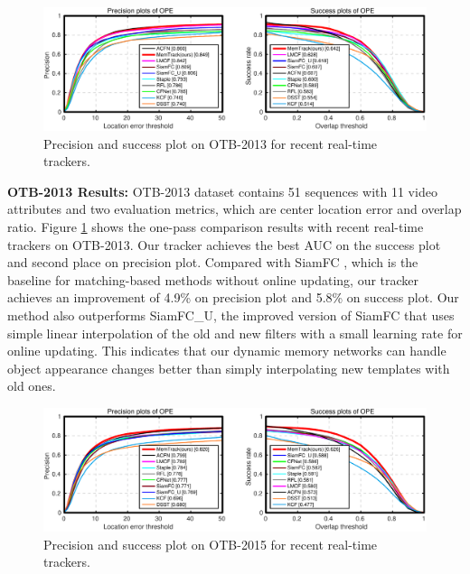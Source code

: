 \documentclass[runningheads]{llncs}
\begin{document}
\begin{figure}[t]
	\begin{center}
		\includegraphics[width=0.85\linewidth]{realtime-cvpr13.pdf}
	\end{center}
	\vspace{-5mm}
	\caption{Precision and success plot on OTB-2013 for recent real-time trackers.
	}
	\label{fig:8}
\end{figure}

\textbf{OTB-2013 Results:} OTB-2013 \cite{Wu2013} dataset contains 51 sequences with 11 video attributes and two evaluation metrics, which are center location error and overlap ratio. Figure \ref{fig:8} shows the one-pass comparison results with recent real-time trackers on OTB-2013. Our tracker achieves the best AUC on the success plot and second place on precision plot. Compared with SiamFC \cite{Bertinetto2016}, which is the baseline for matching-based methods without online updating, our tracker 
achieves an improvement of 4.9\% on precision plot and 5.8\% on success plot.
Our method also outperforms SiamFC\_U, the improved version of SiamFC \cite{Valmadre2017} that uses simple linear interpolation of the old and new filters with a small learning rate for online updating. 
This indicates that our dynamic memory networks can handle object appearance changes better than simply interpolating new templates with old ones.


\begin{figure}[t]
	\begin{center}
		\includegraphics[width=0.85\linewidth]{realtime-tb100.pdf}
	\end{center}
	\vspace{-5mm}
	\caption{Precision and success plot on OTB-2015 for recent real-time trackers.}
	\label{fig:9}
\end{figure}
\end{document}
